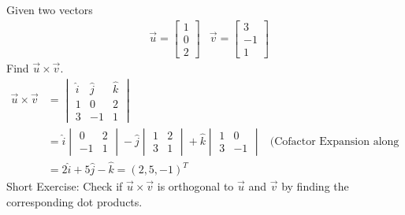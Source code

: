 \begin{exmp}
Given two vectors
\begin{align*}
&\vec{u} =
\begin{bmatrix}
1 \\
0 \\
2
\end{bmatrix}
&\vec{v} =
\begin{bmatrix}
3 \\
-1 \\
1
\end{bmatrix}
\end{align*}
Find $\vec{u} \times \vec{v}$.
\begin{align*}
\vec{u} \times \vec{v} &=
\begin{vmatrix}
\hat{i} & \hat{j} & \hat{k} \\
1 & 0 & 2 \\
3 & -1 & 1
\end{vmatrix} \\
&= 
\hat{i}
\begin{vmatrix}
0 & 2 \\
-1 & 1 
\end{vmatrix}
- \hat{j}
\begin{vmatrix}
1 & 2 \\
3 & 1 
\end{vmatrix}
+ \hat{k}
\begin{vmatrix}
1 & 0 \\
3 & -1 
\end{vmatrix}
& \text{(Cofactor Expansion along the first row)} \\
&= 2\hat{i} + 5\hat{j} - \hat{k} = (2,5,-1)^T
\end{align*} 
Short Exercise: Check if $\vec{u} \times \vec{v}$ is orthogonal to $\vec{u}$ and $\vec{v}$ by finding the corresponding dot products.
\end{exmp}

